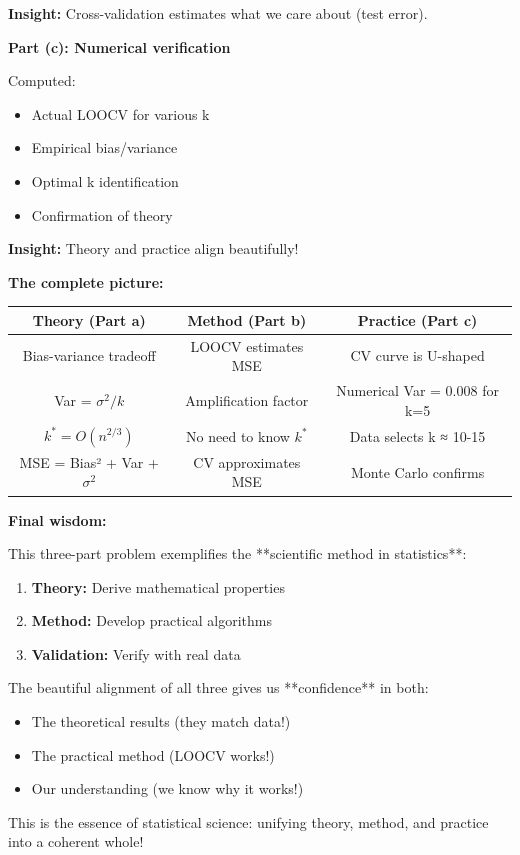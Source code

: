 \documentclass[12pt]{article}
\begin{document}
\begin{explanation}
\textbf{Insight:} Cross-validation estimates what we care about (test error).

\textbf{Part (c): Numerical verification}

Computed:
\begin{itemize}
    \item Actual LOOCV for various k
    \item Empirical bias/variance
    \item Optimal k identification
    \item Confirmation of theory
\end{itemize}

\textbf{Insight:} Theory and practice align beautifully!

\textbf{The complete picture:}

\begin{center}
\begin{tabular}{c|c|c}
\textbf{Theory (Part a)} & \textbf{Method (Part b)} & \textbf{Practice (Part c)} \\
\hline
Bias-variance tradeoff & LOOCV estimates MSE & CV curve is U-shaped \\
Var = $\sigma^2/k$ & Amplification factor & Numerical Var = 0.008 for k=5 \\
$k^* = O(n^{2/3})$ & No need to know $k^*$ & Data selects k ≈ 10-15 \\
MSE = Bias² + Var + $\sigma^2$ & CV approximates MSE & Monte Carlo confirms \\
\end{tabular}
\end{center}

\textbf{Final wisdom:}

This three-part problem exemplifies the **scientific method in statistics**:

\begin{enumerate}
    \item \textbf{Theory:} Derive mathematical properties
    \item \textbf{Method:} Develop practical algorithms
    \item \textbf{Validation:} Verify with real data
\end{enumerate}

The beautiful alignment of all three gives us **confidence** in both:
\begin{itemize}
    \item The theoretical results (they match data!)
    \item The practical method (LOOCV works!)
    \item Our understanding (we know why it works!)
\end{itemize}

This is the essence of statistical science: unifying theory, method, and practice into a coherent whole!

\end{explanation}
\end{document}
